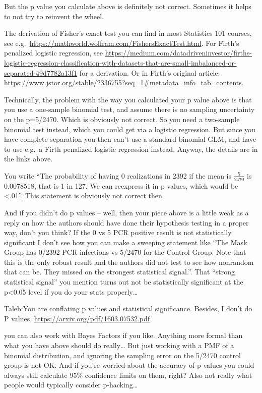 \documentclass[
]{book}
\begin{document}
But the p value you calculate above is definitely not correct. Sometimes it helps to not try to reinvent the wheel.

The derivation of Fisher's exact test you can find in most Statistics 101 courses, see e.g.~\url{https://mathworld.wolfram.com/FishersExactTest.html}. For Firth's penalized logistic regression, see \url{https://medium.com/datadriveninvestor/firths-logistic-regression-classification-with-datasets-that-are-small-imbalanced-or-separated-49d7782a13f1} for a derivation. Or in Firth's original article: \url{https://www.jstor.org/stable/2336755?seq=1\#metadata_info_tab_contents}.

Technically, the problem with the way you calculated your p value above is that you use a one-sample binomial test, and assume there is no sampling uncertainty on the p=5/2470. Which is obviously not correct. So you need a two-sample binomial test instead, which you could get via a logistic regression. But since you have complete separation you then can't use a standard binomial GLM, and have to use e.g.~a Firth penalized logistic regression instead. Anyway, the details are in the links above.

You write ``The probability of having 0 realizations in 2392
if the mean is \(\frac{5}{2470}\) is 0.0078518, that is 1 in 127.
We can reexpress it in p values, which would be \textless.01''.
This statement is obviously not correct then.

And if you didn't do p values -- well, then your piece above is a little weak as a reply on how the authors should have done their hypothesis testing in a proper way, don't you think? If the 0 vs 5 PCR positive result is not statistically significant I don't see how you can make a sweeping statement like ``The Mask Group has 0/2392 PCR infections vs 5/2470 for the Control Group. Note that this is the only robust result and the authors did not test to see how nonrandom that can be. They missed on the strongest statistical signal.''. That ``strong statistical signal'' you mention turns out not be statistically significant at the p\textless0.05 level if you do your stats properly\ldots{}

Taleb:You are conflating p values and statistical significance.
Besides, I don't do P values. \url{https://arxiv.org/pdf/1603.07532.pdf}

you can also work with Bayes Factors if you like. Anything more formal than what you have above should do really\ldots{} But just working with a PMF of a binomial distribution, and ignoring the sampling error on the 5/2470 control group is not OK. And if you're worried about the accuracy of p values you could always still calculate 95\% confidence limits on them, right? Also not really what people would typically consider p-hacking\ldots{}
\end{document}
